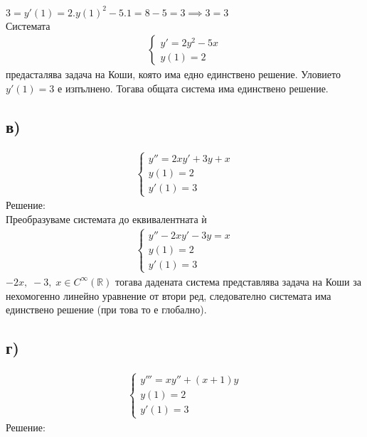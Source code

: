 \documentclass[a4paper, 12pt, oneside]{article}
\newcommand{\R}{\mathbb{R}}
\begin{document}
$3 = y'(1) = 2.y(1)^2 - 5.1 = 8 - 5  = 3 \implies 3 = 3$ \\
Системата 
\begin{align*}
    \begin{cases}
        y' = 2y^2 - 5x \\
        y(1) = 2 
    \end{cases}
\end{align*}
предасталява задача на Коши, която има едно единствено решение. Уловието $y'(1) = 3$
е изпълнено. Тогава общата система има единствено решение.

\subsection{в)}
\begin{align*}
    \begin{cases}
        y'' = 2xy' + 3y + x \\
        y(1) = 2 \\
        y'(1) = 3
    \end{cases}
\end{align*}
Решение: \\

Преобразуваме системата до еквивалентната ѝ
\begin{align*}
    \begin{cases}
        y'' - 2xy' - 3y = x \\
        y(1) = 2 \\
        y'(1) = 3
    \end{cases}
\end{align*}
$-2x, \; -3, \; x \in C^\infty(\R)$  тогава дадената система представлява
задача на Коши за нехомогенно линейно уравнение от втори ред,
следователно системата има единствено решение (при това то е глобално).
\subsection{г)}
\begin{align*}
    \begin{cases}
        y''' = xy'' + (x + 1)y\\
        y(1) = 2 \\
        y'(1) = 3
    \end{cases}
\end{align*}
Решение: \\
\end{document}
